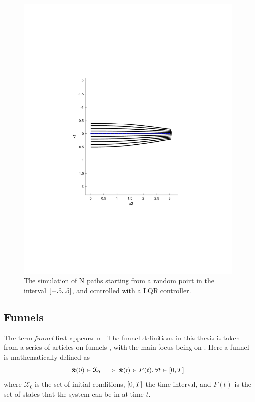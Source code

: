 \begin{figure}
  \centering \includegraphics[scale=.5]{figures/preliminaries/montecarlofunnel}
  \caption{The simulation of N paths starting from a random point in the
    interval \(\lbrack-.5,.5\rbrack\), and controlled with a LQR controller.}
  \label{fig:monte-carlo-sim}
\end{figure}

\subsection{Funnels}
\label{sec:Funnels}

The term \textit{funnel} first appears in \cite{masonMechanicsManipulation1985}.
The funnel definitions in this thesis is taken from a series of articles on
funnels \cite{Tobenkin_2011,tedrakeLQRtreesFeedbackMotion2009,
  majumdarRobustOnlineMotion2013,
  majumdarFunnelLibrariesRealtime2017,ahmadi2014dsos}, with the main focus being
on \cite{majumdarFunnelLibrariesRealtime2017}. Here a funnel is mathematically
defined as
\[
  \bar{\mathbf{x}}(0) \in \mathcal{X}_0 \implies \bar{\mathbf{x}}(t) \in F(t),
  \forall t \in \lbrack0,T\rbrack
\]
where \(\mathcal{X}_0\) is the set of initial conditions, \(\lbrack0,T\rbrack\) the time
interval, and \(F(t)\) is the set of states that the system can be in at time
\(t\).

